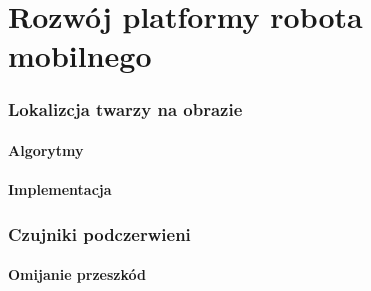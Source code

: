\newpage
\part{Rozwój platformy robota mobilnego}
\section{Lokalizcja twarzy na obrazie}
\subsection{Algorytmy}
\subsection{Implementacja}
\section{Czujniki podczerwieni}
\subsection{Omijanie przeszkód}